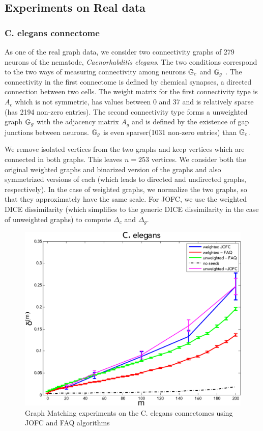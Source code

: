 \documentclass[12pt,oneside,final]{thesis}\usepackage[]{graphicx}\usepackage[]{color}
\begin{document}
\subsection{Experiments on Real data}

\subsubsection{C. elegans connectome}
As one of the real graph data, we consider two connectivity graphs of 279 neurons of the  nematode, \textit{Caenorhabditis elegans}. The two conditions correspond to the two ways of measuring connectivity among neurons $\mathbb{G}_c$ and $\mathbb{G}_g$ . The connectivity in the first connectome is defined by chemical synapses, a directed connection between two cells.  The  weight matrix for the first connectivity type is $A_c$ which is not symmetric, has values between 0 and 37 and is relatively sparse (has 2194 non-zero entries). The second connectivity type forms a unweighted graph $\mathbb{G}_g$ with the adjacency matrix $A_g$ and is defined by the existence of gap junctions between neurons. $\mathbb{G}_g$ is even sparser(1031 non-zero entries) than $\mathbb{G}_c$.

We remove isolated vertices from the two graphs and keep vertices which are connected in both graphs. This leaves $n=253$  vertices. We consider both the original weighted graphs and binarized version of the graphs and also symmetrized versions of each (which leads to directed and undirected graphs, respectively). In the case of weighted graphs, we normalize the two graphs, so that they approximately have the same scale. For JOFC, we use the weighted DICE dissimilarity (which simplifies to the generic DICE dissimilarity in the case of unweighted graphs) to compute $\Delta_c$ and $\Delta_g$.   

\begin{figure}
\includegraphics[scale=0.75]{worm_jofc_vs_faq_wt_unwt-crop}
\caption{Graph Matching experiments on the C. elegans connectomes using JOFC and FAQ algorithms \label{worm_graphmatch}}
\end{figure}
\end{document}
